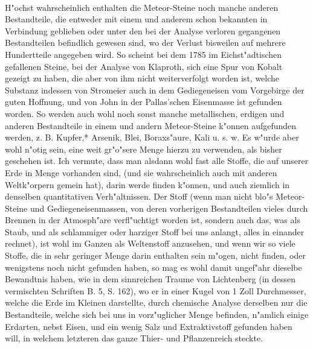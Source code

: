 \documentclass[a4paper, 11pt, oneside, polutonikogreek, german]{article}
\begin{document}
\paragraph{}
H"ochst wahrscheinlich enthalten die Meteor-Steine noch manche anderen Bestandteile, die entweder mit einem und anderem schon bekannten in Verbindung geblieben oder unter den bei der Analyse verloren gegangenen Bestandteilen befindlich gewesen sind, wo der Verlust bisweilen auf mehrere Hundertteile angegeben wird. So scheint bei dem 1785 im Eichst"adtischen gefallenen Steine, bei der Analyse von Klaproth, sich eine Spur von Kobalt gezeigt zu haben, die aber von ihm nicht weiterverfolgt worden ist, welche Substanz indessen von Stromeier auch in dem Gediegeneisen vom Vorgebirge der guten Hoffnung, und von John in der Pallas'schen Eisenmasse ist gefunden worden. So werden auch wohl noch sonst manche metallischen, erdigen und anderen Bestandteile in einem und andern Meteor-Steine k"onnen aufgefunden werden, z. B. Kupfer,* Arsenik, Blei, Boraxs"aure, Kali u. s. w. Es w"urde aber wohl n"otig sein, eine weit gr"o"sere Menge hierzu zu verwenden, als bisher geschehen ist. Ich vermute, dass man alsdann wohl fast alle Stoffe, die auf unserer Erde in Menge vorhanden sind, (und sie wahrscheinlich auch mit anderen Weltk"orpern gemein hat), darin werde finden k"onnen, und auch ziemlich in denselben quantitativen Verh"altnissen. Der Stoff (wenn man nicht blo"s Meteor-Steine und Gediegeneisenmassen, von deren vorherigen Bestandteilen vieles durch Brennen in der Atmosph"are verfl"uchtigt worden ist, sondern auch das, was als Staub, und als schlammiger oder harziger Stoff bei uns anlangt, alles in einander rechnet), ist wohl im Ganzen als Weltenstoff anzusehen, und wenn wir so viele Stoffe, die in sehr geringer Menge darin enthalten sein m"ogen, nicht finden, oder wenigstens noch nicht gefunden haben, so mag es wohl damit ungef"ahr dieselbe Bewandtnis haben, wie in dem sinnreichen Traume von Lichtenberg (in dessen vermischten Schriften B. 5, S. 162), wo er in einer Kugel von 1 Zoll Durchmesser, welche die Erde im Kleinen darstellte, durch chemische Analyse derselben nur die Bestandteile, welche sich bei uns in vorz"uglicher Menge befinden, n"amlich einige Erdarten, nebst Eisen, und ein wenig Salz und Extraktivstoff gefunden haben will, in welchem letzteren das ganze Thier- und Pflanzenreich steckte.
\subsection{}
\end{document}

